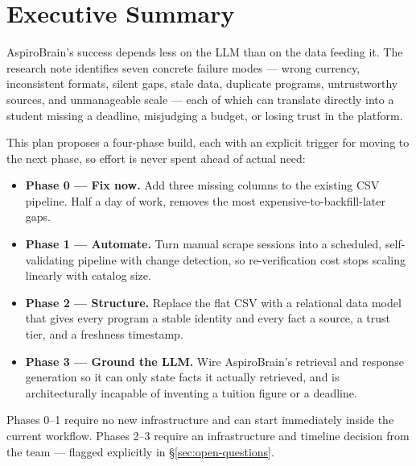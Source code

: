\documentclass[11pt,a4paper]{article}
\begin{document}
\setcounter{page}{2}

\tableofcontents
\thispagestyle{fancy}
\newpage

\section{Executive Summary}

AspiroBrain's success depends less on the LLM than on the data feeding it. The research note identifies seven concrete failure modes --- wrong currency, inconsistent formats, silent gaps, stale data, duplicate programs, untrustworthy sources, and unmanageable scale --- each of which can translate directly into a student missing a deadline, misjudging a budget, or losing trust in the platform.

This plan proposes a four-phase build, each with an explicit trigger for moving to the next phase, so effort is never spent ahead of actual need:

\begin{itemize}[leftmargin=1.4em, itemsep=3pt]
  \item \textbf{Phase 0 --- Fix now.} Add three missing columns to the existing CSV pipeline. Half a day of work, removes the most expensive-to-backfill-later gaps.
  \item \textbf{Phase 1 --- Automate.} Turn manual scrape sessions into a scheduled, self-validating pipeline with change detection, so re-verification cost stops scaling linearly with catalog size.
  \item \textbf{Phase 2 --- Structure.} Replace the flat CSV with a relational data model that gives every program a stable identity and every fact a source, a trust tier, and a freshness timestamp.
  \item \textbf{Phase 3 --- Ground the LLM.} Wire AspiroBrain's retrieval and response generation so it can only state facts it actually retrieved, and is architecturally incapable of inventing a tuition figure or a deadline.
\end{itemize}

Phases 0--1 require no new infrastructure and can start immediately inside the current workflow. Phases 2--3 require an infrastructure and timeline decision from the team --- flagged explicitly in \S\ref{sec:open-questions}.
\end{document}
